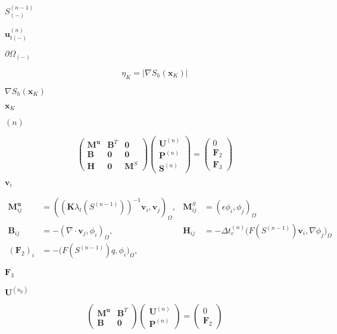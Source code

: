 \documentclass{article}
\begin{document}
$S^{(n-1)}_{(-)}$
\pagebreak

$\mathbf{u}^{(n)}_{t(-)}$
\pagebreak

$\partial\Omega_{(-)}$
\pagebreak

\[ \eta_{K} = |\nabla S_h(\mathbf x_K)| \]
\pagebreak

$\nabla S_h(\mathbf x_K)$
\pagebreak

$\mathbf x_K$
\pagebreak

$(n)$
\pagebreak

\[ \left( \begin{array}{ccc} \mathbf{M}^{\mathbf{u}} & \mathbf{B}^{T} & \mathbf{0} \\ \mathbf{B} & \mathbf{0} & \mathbf{0} \\ \mathbf{H} & \mathbf{0} & \mathbf{M}^{S} \end{array} \right) \left( \begin{array}{c} \mathbf{U}^{(n)} \\ \mathbf{P}^{(n)} \\ \mathbf{S}^{(n)} \end{array} \right) = \left( \begin{array}{c} 0 \\ \mathbf{F}_{2} \\ \mathbf{F}_{3} \end{array} \right) \]
\pagebreak

$\mathbf{v}_i$
\pagebreak

\begin{align*} \mathbf{M}^{\mathbf{u}}_{ij} &= \left( \left( \mathbf{K} \lambda_t\left(S^{(n-1)}\right) \right)^{-1} \mathbf{v}_{i},\mathbf{v}_{j}\right)_{\Omega}, & \mathbf{M}^{S}_{ij} &= \left(\epsilon \phi_i,\phi_j\right)_{\Omega} \\ \mathbf{B}_{ij} &= - \left( \nabla \cdot \mathbf{v}_{j},\phi_{i}\right)_{\Omega}, & \mathbf{H}_{ij} &= - \Delta t^{(n)}_c \Big( F\left(S^{(n-1)}\right) \mathbf{v}_i,\nabla\phi_j\Big)_{\Omega} \\ \left(\mathbf{F}_{2}\right)_i &= - \big(F\left(S^{(n-1)}\right)q,\phi_i\big)_{\Omega}, \end{align*}
\pagebreak

$\mathbf{F}_{3}$
\pagebreak

$\mathbf U^{(n_p)}$
\pagebreak

\[ \left( \begin{array}{cc} \mathbf{M}^{\mathbf{u}} & \mathbf{B}^{T} \\ \mathbf{B} & \mathbf{0} \end{array} \right) \left( \begin{array}{c} \mathbf{U}^{(n)} \\ \mathbf{P}^{(n)} \end{array} \right) = \left( \begin{array}{c} 0 \\ \mathbf{F}_{2} \end{array} \right) \]
\pagebreak
\end{document}
